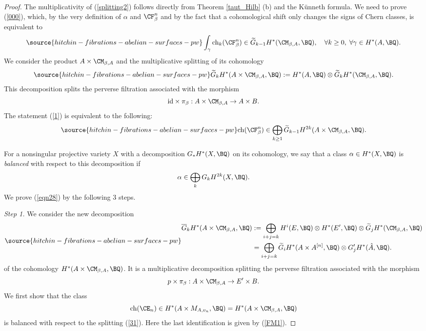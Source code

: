 \begin{proof}
The multiplicativity of (\ref{splitting2}) follows directly from Theorem \ref{taut_Hilb} (b) and the K\"unneth
formula. We need to prove (\ref{000}), which,  { by the very definition of $\alpha$ and $\CF^n_\beta$ and by the fact that
a cohomological shift only changes the signs of Chern classes},
 is  equivalent to
\begin{equation}\label{1}
\source{hitchin-fibrations-abelian-surfaces-pw}
\int_\gamma \mathrm{ch}_k(\CF^n_\beta) \in \widetilde{G}_{k-1} H^\ast(\CM_{\beta,A}, \BQ),\quad
\forall k\geq 0, \; \forall \gamma \in H^\ast(A, \BQ).
\end{equation}
We consider the  product  $A \times \CM_{\beta,A}$ and the multiplicative splitting
of its cohomology
\begin{equation}\label{eqn27}
\source{hitchin-fibrations-abelian-surfaces-pw}
\widetilde{G}_kH^\ast(A \times \CM_{\beta,A} ,\BQ) := H^\ast(A, \BQ) \otimes \widetilde{G}_kH^\ast(\CM_{\beta,A}, \BQ).
\end{equation} This decomposition splits the perverse filtration associated with the morphism
\[
\mathrm{id}\times \pi_\beta: A \times \CM_{\beta, A} \to A \times B.
\]
The statement (\ref{1}) is equivalent to the following:
\begin{equation}\label{eqn28}
\source{hitchin-fibrations-abelian-surfaces-pw}
\mathrm{ch}(\CF^n_\beta) \in \bigoplus_{k\geq 1} \widetilde{G}_{k-1} H^{2k}(A\times \CM_{\beta, A}, \BQ).
\end{equation}

For a nonsingular projective variety $X$ with a decomposition $G_*H^*(X, \BQ)$ on its cohomology, we say that a class $\alpha \in H^*(X, \BQ)$ is \emph{balanced} with respect to this decomposition if
\[
\alpha \in \bigoplus_{k} G_{k} H^{2k}(X, \BQ).
\]
We prove (\ref{eqn28}) by the following 3 steps.

\emph{Step 1.} We consider the new decomposition
\begin{equation}\label{31}
\source{hitchin-fibrations-abelian-surfaces-pw}
\begin{split}
\overline{G}_k H^*(A \times \CM_{\beta, A}, \BQ)& := \bigoplus_{i+j=k} H^i(E, \BQ) \otimes H^*(E', \BQ) \otimes \widetilde{G}_jH^*(\CM_{\beta,A}, \BQ)\\
& = \bigoplus_{i+j=k} \widetilde{G}_i H^\ast(A \times A^{[n]}, \BQ) \otimes G'_jH^\ast(\hat{A}, \BQ).
\end{split}
\end{equation}
of the cohomology $H^\ast(A\times \CM_{\beta,A}, \BQ)$. It is a multiplicative decomposition splitting the perverse filtration associated with the morphism
\[
p \times \pi_\beta: A\times \CM_{\beta,A} \to E' \times B.
\]
We first show that the class
\[
\mathrm{ch}(\CE_n) \in H^\ast(A \times M_{A, v_n}, \BQ) = H^*(A \times \CM_{\beta,A}, \BQ)
\]
is balanced with respect to the splitting (\ref{31}). Here the last identification is given by (\ref{FM1}).



\end{proof}
